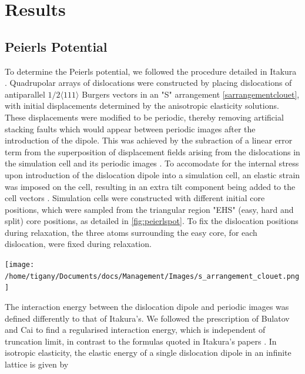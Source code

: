 \documentclass[a4paper]{article}
\begin{document}
\section{Results}
\label{sec:org9c3804c}



\subsection{Peierls Potential}
\label{sec:org5a63924}

To determine the Peierls potential, we followed the procedure detailed in Itakura
\cite{Itakura2012}. Quadrupolar arrays of dislocations were constructed by placing dislocations of
antiparallel \(1/2\langle 111\rangle\) Burgers vectors in an "S" arrangement \cite{Clouet2012} \ref{sarrangementclouet}, with
initial displacements determined by the anisotropic elasticity solutions. These displacements
were modified to be periodic, thereby removing artificial stacking faults which would appear
between periodic images after the introduction of the dipole. This was achieved by the subraction
of a linear error term from the superposition of displacement fields arising from the
dislocations in the simulation cell and its periodic images \cite{vasilybulatov2006}. To accomodate
for the internal stress upon introduction of the dislocation dipole into a simulation cell, an
elastic strain was imposed on the cell, resulting in an extra tilt component being added to the
cell vectors \cite{Clouet2012,vasilybulatov2006}. Simulation cells were constructed with different
initial core positions, which were sampled from the triangular region "EHS" (easy, hard and
split) core positions, as detailed in \ref{fig:peierlspot}. To fix the dislocation positions during
relaxation, the three atoms surrounding the easy core, for each dislocation, were fixed during
relaxation. 


\begin{center}
\texttt{[image: /home/tigany/Documents/docs/Management/Images/s\_arrangement\_clouet.png]}
\label{org7bd8df3}
\end{center}


The interaction energy between the dislocation dipole and periodic images was defined differently
to that of Itakura's. We followed the prescription of Bulatov and Cai \cite{vasilybulatov2006} to
find a regularised interaction energy, which is independent of truncation limit, in contrast to
the formulas quoted in Itakura's papers \cite{Itakura2012}. In
isotropic elasticity, the elastic energy of a single dislocation dipole in an
infinite lattice is given by
\end{document}

